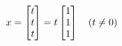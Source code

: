 \documentclass[preview]{standalone}
\begin{document}
\begin{align*}
\special{dvisvgm:raw <g id='unique000'>}x = \begin{bmatrix} t \\ t \\ t \end{bmatrix} = t \begin{bmatrix} 1 \\ 1 \\ 1 \end{bmatrix} \quad (t \neq 0)\special{dvisvgm:raw </g>}
\end{align*}
\end{document}

